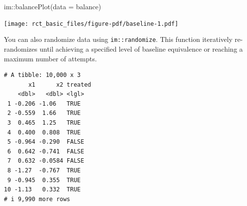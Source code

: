 \documentclass[
  letterpaper,
  DIV=11,
  numbers=noendperiod]{scrreprt}
\newenvironment{Shaded}{\begin{snugshade}}{\end{snugshade}}
\newcommand{\AttributeTok}[1]{\textcolor[rgb]{0.40,0.45,0.13}{#1}}
\newcommand{\CommentTok}[1]{\textcolor[rgb]{0.37,0.37,0.37}{#1}}
\newcommand{\DecValTok}[1]{\textcolor[rgb]{0.68,0.00,0.00}{#1}}
\newcommand{\FunctionTok}[1]{\textcolor[rgb]{0.28,0.35,0.67}{#1}}
\newcommand{\NormalTok}[1]{\textcolor[rgb]{0.00,0.23,0.31}{#1}}
\newcommand{\OtherTok}[1]{\textcolor[rgb]{0.00,0.23,0.31}{#1}}
\newcommand{\SpecialCharTok}[1]{\textcolor[rgb]{0.37,0.37,0.37}{#1}}
\newcommand{\StringTok}[1]{\textcolor[rgb]{0.13,0.47,0.30}{#1}}
\begin{document}
\begin{Shaded}
\begin{Highlighting}[]
\NormalTok{im}\SpecialCharTok{::}\FunctionTok{balancePlot}\NormalTok{(}\AttributeTok{data =}\NormalTok{ balance)}
\end{Highlighting}
\end{Shaded}

\texttt{[image: rct\_basic\_files/figure-pdf/baseline-1.pdf]}

You can also randomize data using \texttt{im::randomize}. This function
iteratively re-randomizes until achieving a specified level of baseline
equivalence or reaching a maximum number of attempts.

\begin{Shaded}
\end{Shaded}

\begin{verbatim}
# A tibble: 10,000 x 3
       x1      x2 treated
    <dbl>   <dbl> <lgl>  
 1 -0.206 -1.06   TRUE   
 2 -0.559  1.66   TRUE   
 3  0.465  1.25   TRUE   
 4  0.400  0.808  TRUE   
 5 -0.964 -0.290  FALSE  
 6  0.642 -0.741  FALSE  
 7  0.632 -0.0584 FALSE  
 8 -1.27  -0.767  TRUE   
 9 -0.945  0.355  TRUE   
10 -1.13   0.332  TRUE   
# i 9,990 more rows
\end{verbatim}

\begin{Shaded}
\end{Shaded}
\end{document}
